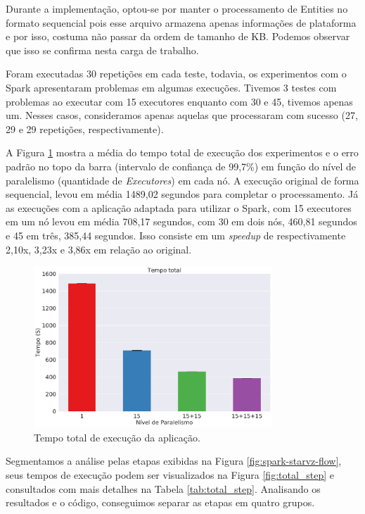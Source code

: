 Durante a implementação, optou-se por manter o processamento de Entities
no formato sequencial pois esse arquivo armazena apenas informações de 
plataforma e por isso, costuma não passar da ordem de tamanho de KB. Podemos 
observar que isso se confirma nesta carga de trabalho.


Foram executadas 30 repetições em cada teste, todavia, os experimentos com o 
Spark apresentaram problemas em algumas execuções. Tivemos 3 testes com 
problemas ao executar com 15 executores enquanto com 30 e 45, tivemos apenas 
um. Nesses casos, consideramos apenas aquelas que processaram com sucesso (27, 
29 e 29 repetições, respectivamente). 

A Figura \ref{fig:total_full} mostra a média do tempo total de execução dos 
experimentos e o erro padrão no topo da barra (intervalo de confiança 
de 99,7\%) em função do nível de paralelismo (quantidade de \emph{Executores}) 
em cada nó. A execução original de forma sequencial, levou em média 1489,02 
segundos para completar o processamento. Já as execuções com a aplicação 
adaptada para utilizar o Spark, com 15 executores em um nó levou em média 
708,17 segundos, com 30 em dois nós, 460,81 segundos e 45 em três, 385,44 
segundos. Isso consiste em um \emph{speedup} de respectivamente 2,10x, 3,23x e 
3,86x em relação ao original.

\begin{figure}[ht]
\centerline{
\includegraphics[width=0.8\textwidth]{./img/total.pdf}}
 \caption{Tempo total de execução da aplicação.}
 \label{fig:total_full}
\end{figure}


Segmentamos a análise pelas etapas exibidas na Figura 
\ref{fig:spark-starvz-flow}, seus tempos de execução podem ser visualizados na 
Figura \ref{fig:total_step} e consultados com mais detalhes na Tabela 
\ref{tab:total_step}. Analisando os resultados e o código, conseguimos 
separar as etapas em quatro grupos.

